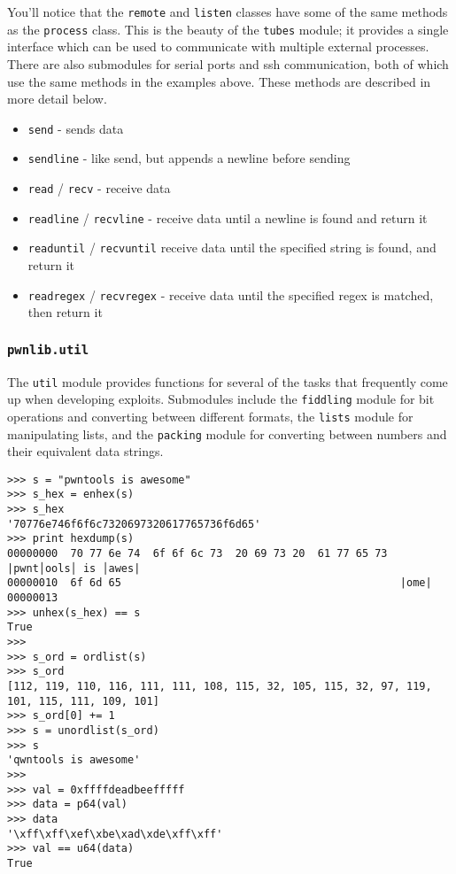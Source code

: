 \documentclass{article}
\begin{document}
You'll notice that the \texttt{remote} and \texttt{listen} classes have some of
the same methods as the \texttt{process} class. This is the beauty of the
\texttt{tubes} module; it provides a single interface which can be used to
communicate with multiple external processes. There are also submodules for
serial ports and ssh communication, both of which use the same methods in the
examples above. These methods are described in more detail below.

\begin{itemize}
    \item \texttt{send} - sends data
    \item \texttt{sendline} - like send, but appends a newline before sending
    \item \texttt{read} / \texttt{recv} - receive data
    \item \texttt{readline} / \texttt{recvline} - receive data until a newline is found and return
        it
    \item \texttt{readuntil} / \texttt{recvuntil} receive data until the specified string is found,
        and return it
    \item \texttt{readregex} / \texttt{recvregex} - receive data until the specified regex is
        matched, then return it
\end{itemize}

\subsubsection{\texttt{pwnlib.util}}
The \texttt{util} module provides functions for several of the tasks that
frequently come up when developing exploits. Submodules include the
\texttt{fiddling} module for bit operations and converting between different
formats, the \texttt{lists} module for manipulating lists, and the
\texttt{packing} module for converting between numbers and their equivalent
data strings.

\begin{lstlisting}
>>> s = "pwntools is awesome"
>>> s_hex = enhex(s)
>>> s_hex
'70776e746f6f6c7320697320617765736f6d65'
>>> print hexdump(s)
00000000  70 77 6e 74  6f 6f 6c 73  20 69 73 20  61 77 65 73  |pwnt│ools│ is │awes|
00000010  6f 6d 65                                            |ome|
00000013
>>> unhex(s_hex) == s
True
>>>
>>> s_ord = ordlist(s)
>>> s_ord
[112, 119, 110, 116, 111, 111, 108, 115, 32, 105, 115, 32, 97, 119, 101, 115, 111, 109, 101]
>>> s_ord[0] += 1
>>> s = unordlist(s_ord)
>>> s
'qwntools is awesome'
>>>
>>> val = 0xffffdeadbeefffff
>>> data = p64(val)
>>> data
'\xff\xff\xef\xbe\xad\xde\xff\xff'
>>> val == u64(data)
True
\end{lstlisting}
\end{document}
